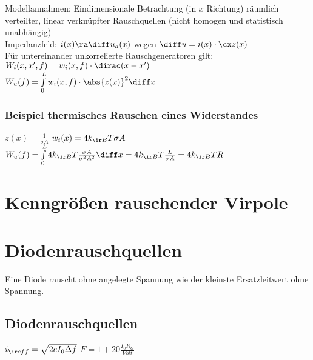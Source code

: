 \documentclass[fs, footer]{latex4ei}
\begin{document}
\begin{multicols}{4}
{	Modellannahmen: Eindimensionale Betrachtung (in $x$ Richtung) räumlich verteilter, linear verknüpfter Rauschquellen (nicht homogen und statistisch unabhängig)\\


	Impedanzfeld: $i(x) \ra \diff u_a(x)$ \quad wegen $\diff u = i(x) \cdot \cx z(x)$\\
	
	Für untereinander unkorrelierte Rauschgeneratoren gilt:\\
	$W_i(x,x',f) = w_i(x,f) \cdot \dirac(x-x')$\\
	$W_u(f) = \int\limits_0^L w_i(x,f) \cdot \abs{z(x)}^2 \diff x$\\
	   
		\subsubsection{Beispiel thermisches Rauschen eines Widerstandes}
		$z(x) = \frac{1}{\sigma A}$ \qquad $w_i(x) = 4 k_{\ir B} T \sigma A$\\
		$W_u(f) = \int\limits_0^L 4 k_{\ir B} T \frac{\sigma A}{\sigma^2 A^2} \diff x= 4 k_{\ir B} T \frac{L}{\sigma A} = 4 k_{\ir B} T R$

}

\section{Kenngrößen rauschender Virpole}





\section{Diodenrauschquellen}
	Eine Diode rauscht ohne angelegte Spannung wie der kleinste Ersatzleitwert ohne Spannung.




	\subsection{Diodenrauschquellen}
	$i_{\ir eff} = \sqrt{2 e I_0 \Delta f}$
	$F = 1 + 20 \frac{I_0 R_G}{Volt}$



\end{multicols}
\end{document}
